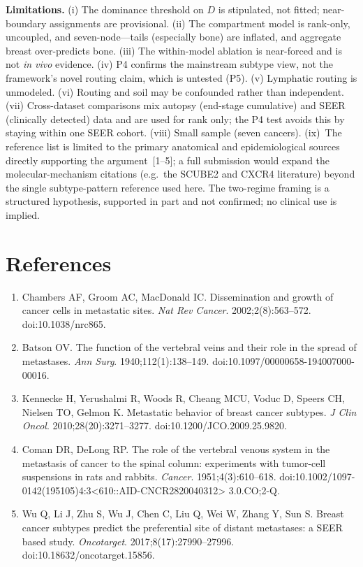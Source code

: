 \documentclass[11pt]{article}
\begin{document}
\textbf{Limitations.} (i) The dominance threshold on $D$ is stipulated, not fitted;
near-boundary assignments are provisional. (ii) The compartment model is
rank-only, uncoupled, and seven-node---tails (especially bone) are inflated, and
aggregate breast over-predicts bone. (iii) The within-model ablation is near-forced
and is not \emph{in vivo} evidence. (iv) P4 confirms the mainstream subtype view,
not the framework's novel routing claim, which is untested (P5). (v) Lymphatic
routing is unmodeled. (vi) Routing and soil may be confounded rather than
independent. (vii) Cross-dataset comparisons mix autopsy (end-stage cumulative)
and SEER (clinically detected) data and are used for rank only; the P4 test avoids
this by staying within one SEER cohort. (viii) Small sample (seven cancers).
(ix)~The reference list is limited to the primary anatomical and
epidemiological sources directly supporting the argument~[1--5]; a full
submission would expand the molecular-mechanism citations (e.g.\ the SCUBE2 and
CXCR4 literature) beyond the single subtype-pattern reference used here. The
two-regime framing is a structured hypothesis, supported in part and not
confirmed; no clinical use is implied.

\section*{References}
{\footnotesize
\begin{enumerate}[leftmargin=2em,itemsep=0.15em]
  \item Chambers AF, Groom AC, MacDonald IC. Dissemination and growth of cancer
  cells in metastatic sites. \emph{Nat Rev Cancer}. 2002;2(8):563--572.
  doi:10.1038/nrc865.
  \item Batson OV. The function of the vertebral veins and their role in the
  spread of metastases. \emph{Ann Surg}. 1940;112(1):138--149.
  doi:10.1097/00000658-194007000-00016.
  \item Kennecke H, Yerushalmi R, Woods R, Cheang MCU, Voduc D, Speers CH,
  Nielsen TO, Gelmon K. Metastatic behavior of breast cancer subtypes.
  \emph{J Clin Oncol}. 2010;28(20):3271--3277. doi:10.1200/JCO.2009.25.9820.
  \item Coman DR, DeLong RP. The role of the vertebral venous system in the
  metastasis of cancer to the spinal column: experiments with tumor-cell
  suspensions in rats and rabbits. \emph{Cancer}. 1951;4(3):610--618.
  doi:10.1002/1097-0142(195105)4:3\textless610::AID-CNCR2820040312\textgreater
  3.0.CO;2-Q.
  \item Wu Q, Li J, Zhu S, Wu J, Chen C, Liu Q, Wei W, Zhang Y, Sun S. Breast
  cancer subtypes predict the preferential site of distant metastases: a SEER
  based study. \emph{Oncotarget}. 2017;8(17):27990--27996.
  doi:10.18632/oncotarget.15856.
\end{enumerate}}
\end{document}
